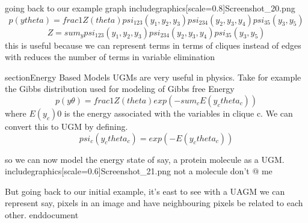 going back to our example graph
includegraphics[scale=0.8]{Screenshot_20.png}
$$
p(ytheta) = frac{1}{Z(theta)}  psi_{123}(y_1, y_2, y_3) psi_{234}(y_2, y_3, y_4) psi_{35}(y_3, y_5)
$$
$$
Z = sum_y psi_{123}(y_1, y_2, y_3)psi_{234}(y_2, y_3, y_4)psi_{35}(y_3, y_5)
$$
this is useful because we can represent terms in terms of cliques instead of edges with reduces the number of terms in variable elimination

section{Energy Based Models}
UGMs are very useful in physics. Take for example the Gibbs distribution used for modeling of Gibbs free Energy
$$p(yθ) = frac{1}{Z(theta)} exp(−sum_c E(y_ctheta_c)) $$
where $E(y_c)  0$ is the energy associated with the variables in clique c. We can convert this to
UGM by defining.
$$psi_c(y_ctheta_c) = exp(−E(y_ctheta_c))$$

so we can now model the energy state of say, a protein molecule as a UGM.
includegraphics[scale=0.6]{Screenshot_21.png}
not a molecule don't @ me

But going back to our initial example, it's east to see with a UAGM we can represent say, pixels in an image and have neighbouring pixels be related to each other.
end{document}
